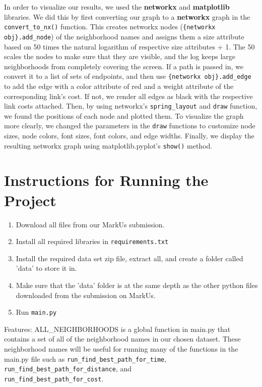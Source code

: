 \documentclass[fontsize=11pt]{article}
\begin{document}
In order to visualize our results, we used the \textbf{networkx} and \textbf{matplotlib} libraries. We did this by first converting our graph to a \textbf{networkx} graph in the \texttt{convert\_to\_nx()} function. This creates networkx nodes (\texttt{\{networkx obj\}.add\_node}) of the neighborhood names and assigns them a size attribute based on 50 times the natural logarithm of respective size attributes + 1. The 50 scales the nodes to make sure that they are visible, and the log keeps large neighborhoods from completely covering the screen. If a path is passed in, we convert it to a list of sets of endpoints, and then use \texttt{\{networkx obj\}.add\_edge} to add the edge with a color attribute of red and a weight attribute of the corresponding link's cost. If not, we render all edges as black with the respective link costs attached. Then, by using networkx's \texttt{spring\_layout} and \texttt{draw} function, we found the positions of each node and plotted them. To visualize the graph more clearly, we changed the parameters in the \texttt{draw} functions to customize node sizes, node colors, font sizes, font colors, and edge widths. Finally, we display the resulting networkx graph using matplotlib.pyplot's \texttt{show()} method.
\ \ \ 

\section*{Instructions for Running the Project}

\begin{enumerate}
    \item Download all files from our MarkUs submission.
    \item Install all required libraries in \texttt{requirements.txt}
    \item Install the required data set zip file, extract all, and create a folder called 'data' to store it in.
    \item Make sure that the 'data' folder is at the same depth as the other python files downloaded from the submission on MarkUs.
    \item Run \texttt{main.py}
\end{enumerate}


Features: 
ALL\_NEIGHBORHOODS is a global function in main.py that contains a set of all of the neighborhood names in our chosen dataset. These neighborhood names will be useful for running many of the functions in the main.py file such as \texttt{run\_find\_best\_path\_for\_time},  \texttt{run\_find\_best\_path\_for\_distance}, and \\
\texttt{run\_find\_best\_path\_for\_cost}. \newline
\end{document}
